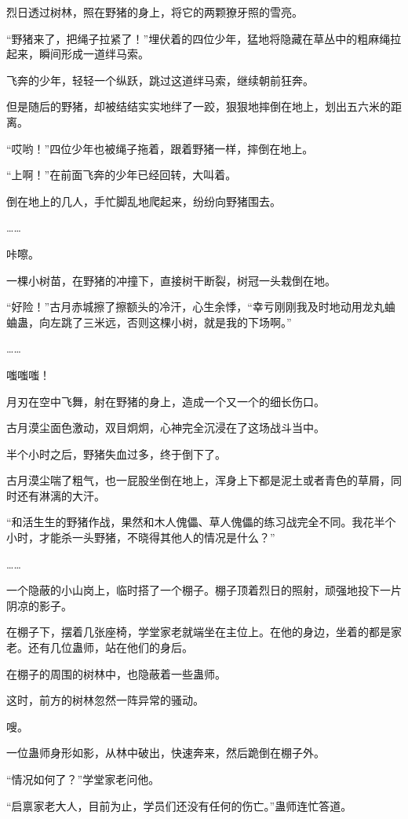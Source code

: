 \begin{this_body}
烈日透过树林，照在野猪的身上，将它的两颗獠牙照的雪亮。

“野猪来了，把绳子拉紧了！”埋伏着的四位少年，猛地将隐藏在草丛中的粗麻绳拉起来，瞬间形成一道绊马索。

飞奔的少年，轻轻一个纵跃，跳过这道绊马索，继续朝前狂奔。

但是随后的野猪，却被结结实实地绊了一跤，狠狠地摔倒在地上，划出五六米的距离。

“哎哟！”四位少年也被绳子拖着，跟着野猪一样，摔倒在地上。

“上啊！”在前面飞奔的少年已经回转，大叫着。

倒在地上的几人，手忙脚乱地爬起来，纷纷向野猪围去。

……

咔嚓。

一棵小树苗，在野猪的冲撞下，直接树干断裂，树冠一头栽倒在地。

“好险！”古月赤城擦了擦额头的冷汗，心生余悸，“幸亏刚刚我及时地动用龙丸蛐蛐蛊，向左跳了三米远，否则这棵小树，就是我的下场啊。”

……

嗤嗤嗤！

月刃在空中飞舞，射在野猪的身上，造成一个又一个的细长伤口。

古月漠尘面色激动，双目炯炯，心神完全沉浸在了这场战斗当中。

半个小时之后，野猪失血过多，终于倒下了。

古月漠尘喘了粗气，也一屁股坐倒在地上，浑身上下都是泥土或者青色的草屑，同时还有淋漓的大汗。

“和活生生的野猪作战，果然和木人傀儡、草人傀儡的练习战完全不同。我花半个小时，才能杀一头野猪，不晓得其他人的情况是什么？”

……

一个隐蔽的小山岗上，临时搭了一个棚子。棚子顶着烈日的照射，顽强地投下一片阴凉的影子。

在棚子下，摆着几张座椅，学堂家老就端坐在主位上。在他的身边，坐着的都是家老。还有几位蛊师，站在他们的身后。

在棚子的周围的树林中，也隐蔽着一些蛊师。

这时，前方的树林忽然一阵异常的骚动。

嗖。

一位蛊师身形如影，从林中破出，快速奔来，然后跪倒在棚子外。

“情况如何了？”学堂家老问他。

“启禀家老大人，目前为止，学员们还没有任何的伤亡。”蛊师连忙答道。


\end{this_body}
